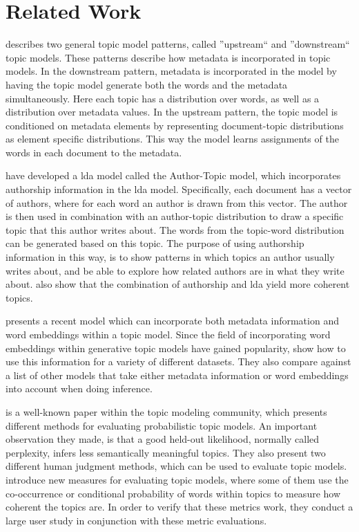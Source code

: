 \section{Related Work}

\citet{mimno2008topic} describes two general topic model patterns, called ''upstream`` and ''downstream`` topic models.
These patterns describe how metadata is incorporated in topic models.
In the downstream pattern, metadata is incorporated in the model by having the topic model generate both the words and the metadata simultaneously.
Here each topic has a distribution over words, as well as a distribution over metadata values.
In the upstream pattern, the topic model is conditioned on metadata elements by representing document-topic distributions as element specific distributions.
This way the model learns assignments of the words in each document to the metadata.

\citet{author_topic_2012} have developed a \gls{lda} model called the Author-Topic model, which incorporates authorship information in the \gls{lda} model.
Specifically, each document has a vector of authors, where for each word an author is drawn from this vector.
The author is then used in combination with an author-topic distribution to draw a specific topic that this author writes about.
The words from the topic-word distribution can be generated based on this topic.
The purpose of using authorship information in this way, is to show patterns in which topics an author usually writes about, and be able to explore how related authors are in what they write about.
\citeauthor{author_topic_2012} also show that the combination of authorship and \gls{lda} yield more coherent topics.


\citet{MetaLDA2017} presents a recent model which can incorporate both metadata information and word embeddings within a topic model.
Since the field of incorporating word embeddings within generative topic models have gained popularity\cite{dieng2020topic}, \citet{MetaLDA2017} show how to use this information for a variety of different datasets.
They also compare against a list of other models that take either metadata information or word embeddings into account when doing inference.


\citet{tea_leaves} is a well-known paper within the topic modeling community, which presents different methods for evaluating probabilistic topic models. 
An important observation they made, is that a good held-out likelihood, normally called perplexity, infers less semantically meaningful topics.
They also present two different human judgment methods, which can be used to evaluate topic models.
\citet{topic_coherence_2015} introduce new measures for evaluating topic models, where some of them use the co-occurrence or conditional probability of words within topics to measure how coherent the topics are. 
In order to verify that these metrics work, they conduct a large user study in conjunction with these metric evaluations.


